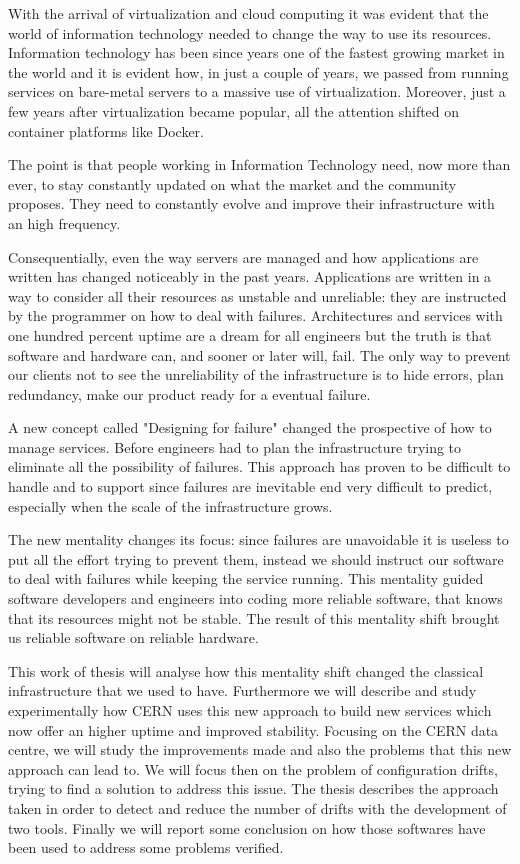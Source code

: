 
With the arrival of virtualization and cloud computing it was evident that
the world of information technology needed to change the way to use its
resources. Information technology has been since years one of the fastest
growing market in the world and it is evident how, in just a couple of
years, we passed from running services on bare-metal servers to a massive
use of virtualization. Moreover, just a few years after virtualization
became popular, all the attention shifted on container platforms like
Docker.

The point is that people working in Information Technology need, now more than
ever, to stay constantly updated on what the market and the community proposes. They need to constantly evolve and improve their infrastructure with an high
frequency.

Consequentially, even the way servers are managed and how applications are
written has changed noticeably in the past years. Applications are written
in a way to consider all their resources as unstable and unreliable: they
are instructed by the programmer on how to deal with failures.
Architectures and services with one hundred percent uptime are a dream for
all engineers but the truth is that software and hardware can, and sooner
or later will, fail. The only way to prevent our clients not to see the
unreliability of the infrastructure is to hide errors, plan redundancy,
make our product ready for a eventual failure.

A new concept called "Designing for failure" changed the prospective of
how to manage services. Before engineers had to plan the infrastructure
trying to eliminate all the possibility of failures. This approach has
proven to be difficult to handle and to support since failures are
inevitable end very difficult to predict, especially when the scale of the
infrastructure grows.

The new mentality changes its focus: since failures are unavoidable it is
useless to put all the effort trying to prevent them, instead we should
instruct our software to deal with failures while keeping the service
running. This mentality guided software developers and engineers into
coding more reliable software, that knows that its resources might not be
stable. The result of this mentality shift brought us reliable software on
reliable hardware.

This work of thesis will analyse how this mentality shift changed the
classical infrastructure that we used to have. Furthermore we will
describe and study experimentally how CERN uses this new approach to build
new services which now offer an higher uptime and improved stability.
Focusing on the CERN data centre, we will study the improvements made and
also the problems that this new approach can lead to. We will focus then
on the problem of configuration drifts, trying to find a solution to
address this issue. The thesis describes the approach taken in order to
detect and reduce the number of drifts with the development of two tools.
Finally we will report some conclusion on how those softwares have been
used to address some problems verified.

